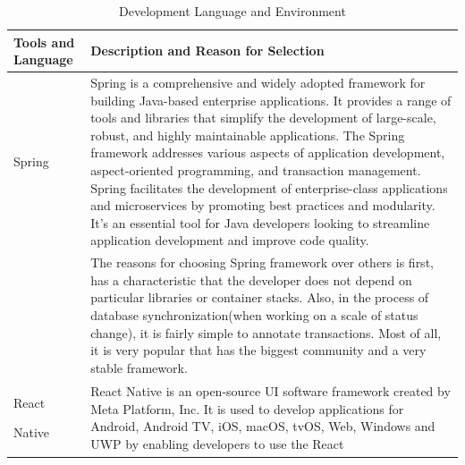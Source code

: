 \documentclass[conference]{IEEEtran}
\begin{document}
    \begin{table}[htbp]
        \caption{Development Language and Environment}
        \centering
        \begin{tabular}{| p{1.2cm}|p{6.8cm} |} 
             \hline
             Tools and Language & Description and Reason for Selection \\ [0.5ex]
             \hline
             Spring & Spring is a comprehensive and widely adopted framework for building Java-based enterprise applications. It provides a range of tools and libraries that simplify the development of large-scale, robust, and highly maintainable applications. The Spring framework addresses various aspects of application development, aspect-oriented programming, and transaction management. Spring facilitates the development of enterprise-class applications and microservices by promoting best practices and modularity. It's an essential tool for Java developers looking to streamline application development and improve code quality.\\
            &
            The reasons for choosing Spring framework over others is first, has a characteristic that the developer does not depend on particular libraries or container stacks. Also, in the process of database synchronization(when working on a scale of status change), it is fairly simple to annotate transactions. Most of all, it is very popular that has the biggest community and a very stable framework. \\
             \hline
             React
             
             Native & React Native is an open-source UI software framework created by Meta Platform, Inc. It is used to develop applications for Android, Android TV, iOS, macOS, tvOS, Web, Windows and UWP by enabling developers to use the React\\
             \hline
               \end{tabular}
    \end{table}
    
\end{document}
